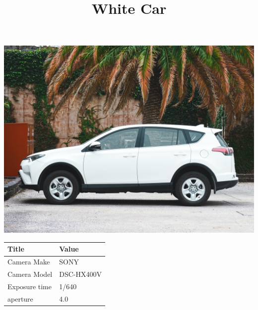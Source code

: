 \documentclass[twocolumn]{article}
\title{White Car}
\begin{document}
\maketitle

\begin{center}
\includegraphics[width=0.7\columnwidth]{Image1}

%


\begin{tabular}{| m{3cm} | m{3cm} |}
\hline

Title  &  Value   \\

\hline
Camera Make  & SONY   \\
\hline
Camera Model  & DSC-HX400V   \\
\hline
Exposure time  & 1/640  \\
\hline
aperture & 4.0 \\
\hline


\end{tabular}


\end{center}

\pagebreak
\end{document}
